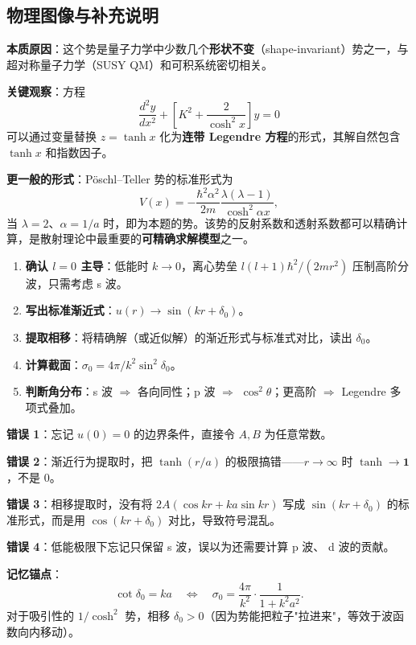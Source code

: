 \subsection{物理图像与补充说明}

\begin{insightbox}
\textbf{本质原因}：这个势是量子力学中少数几个\textbf{形状不变}（shape-invariant）势之一，与超对称量子力学（SUSY QM）和可积系统密切相关。

\textbf{关键观察}：方程
\[
\frac{d^2y}{dx^2} + \left[K^2 + \frac{2}{\cosh^2 x}\right]y = 0
\]
可以通过变量替换 $z = \tanh x$ 化为\textbf{连带 Legendre 方程}的形式，其解自然包含 $\tanh x$ 和指数因子。

\textbf{更一般的形式}：Pöschl--Teller 势的标准形式为
\[
V(x) = -\frac{\hbar^2\alpha^2}{2m}\frac{\lambda(\lambda-1)}{\cosh^2\alpha x},
\]
当 $\lambda=2$、$\alpha=1/a$ 时，即为本题的势。该势的反射系数和透射系数都可以精确计算，是散射理论中最重要的\textbf{可精确求解模型}之一。
\end{insightbox}

\begin{tipbox}
\begin{enumerate}[nosep]
\item \textbf{确认 $l=0$ 主导}：低能时 $k\to 0$，离心势垒 $l(l+1)\hbar^2/(2mr^2)$ 压制高阶分波，只需考虑 s 波。
\item \textbf{写出标准渐近式}：$u(r)\to \sin(kr+\delta_0)$。
\item \textbf{提取相移}：将精确解（或近似解）的渐近形式与标准式对比，读出 $\delta_0$。
\item \textbf{计算截面}：$\sigma_0 = 4\pi/k^2 \sin^2\delta_0$。
\item \textbf{判断角分布}：s 波 $\Rightarrow$ 各向同性；p 波 $\Rightarrow$ $\cos^2\theta$；更高阶 $\Rightarrow$ Legendre 多项式叠加。
\end{enumerate}
\end{tipbox}

\begin{warnbox}[常见错误与思路短路]
\textbf{错误 1}：忘记 $u(0)=0$ 的边界条件，直接令 $A,B$ 为任意常数。

\textbf{错误 2}：渐近行为提取时，把 $\tanh(r/a)$ 的极限搞错——$r\to\infty$ 时 $\tanh\to\mathbf{1}$，不是 0。

\textbf{错误 3}：相移提取时，没有将 $2A(\cos kr + ka\sin kr)$ 写成 $\sin(kr+\delta_0)$ 的标准形式，而是用 $\cos(kr+\delta_0)$ 对比，导致符号混乱。

\textbf{错误 4}：低能极限下忘记只保留 s 波，误以为还需要计算 p 波、 d 波的贡献。

\textbf{记忆锚点}：
\[
\cot\delta_0 = ka\quad\Longleftrightarrow\quad \sigma_0 = \frac{4\pi}{k^2}\cdot\frac{1}{1+k^2a^2}.
\]
对于吸引性的 $1/\cosh^2$ 势，相移 $\delta_0 > 0$（因为势能把粒子"拉进来"，等效于波函数向内移动）。
\end{warnbox}
